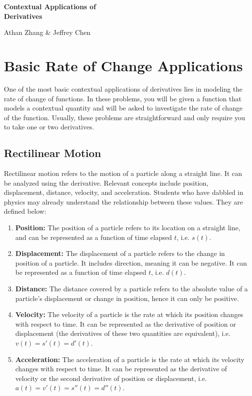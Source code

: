 \documentclass[11pt]{article}
\begin{document}
\textbf{\Huge Contextual Applications of \\ Derivatives}

Athan Zhang \& Jeffrey Chen

\section{Basic Rate of Change Applications}
One of the most basic contextual applications of derivatives lies in modeling the rate of change of functions. In these problems, you will be given a function that models a contextual quantity and will be asked to investigate the rate of change of the function. Usually, these problems are straightforward and only require you to take one or two derivatives.


\subsection{Rectilinear Motion}
Rectilinear motion refers to the motion of a particle along a straight line. It can be analyzed using the derivative. Relevant concepts include position, displacement, distance, velocity, and acceleration. Students who have dabbled in physics may already understand the relationship between these values. They are defined below:

\begin{enumerate}
    \item \textbf{Position:} The position of a particle refers to its location on a straight line, and can be represented as a function of time elapsed $t$, i.e. $s(t)$.
    \item \textbf{Displacement:} The displacement of a particle refers to the change in position of a particle. It includes direction, meaning it can be negative. It can be represented as a function of time elapsed $t$, i.e. $d(t)$.
    \item \textbf{Distance:} The distance covered by a particle refers to the absolute value of a particle's displacement or change in position, hence it can only be positive. 
    \item \textbf{Velocity:} The velocity of a particle is the rate at which its position changes with respect to time. It can be represented as the derivative of position or displacement (the derivatives of these two quantities are equivalent), i.e. $v(t)=s'(t)=d'(t)$.
    \item \textbf{Acceleration:} The acceleration of a particle is the rate at which its velocity changes with respect to time. It can be represented as the derivative of velocity or the second derivative of position or displacement, i.e. $a(t)=v'(t)=s''(t)=d''(t)$.
\end{enumerate}
\end{document}
